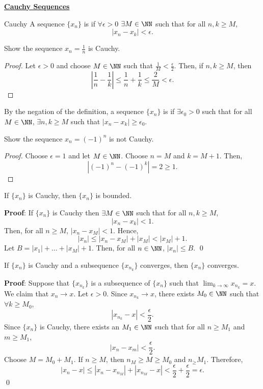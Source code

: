 
\noindent\underline{\textbf{Cauchy Sequences}}

\begin{definition}{Cauchy}
A sequence $\{x_n\}$ is  if $\forall \epsilon>0$ $\exists M \in \NN$ such that for all $n,k \geq M$,
\[
|x_n - x_k| <\epsilon.
\]
\end{definition}

\begin{example}
Show the sequence $x_n = \frac{1}{n}$ is Cauchy. 
\end{example}
\begin{proof}
Let $\epsilon>0$ and choose $M \in \NN$ such that $\frac{1}{M} < \frac{\epsilon}{2}$. Then, if $n,k\geq M$, then 
\[
\left|\frac{1}{n} - \frac{1}{k}\right| \leq \frac{1}{n} + \frac{1}{k} \leq \frac{2}{M} < \epsilon.
\]
\end{proof}

\begin{negation}
By the negation of the definition, a sequence $\{x_n\}$ is  if $\exists \epsilon_0 >0$ such that for all $M\in \NN$, $\exists n,k\geq M$ such that $|x_n - x_k| \geq \epsilon_0$.
\end{negation}

\begin{example}
Show the sequence $x_n = (-1)^n$ is not Cauchy.
\end{example}
\begin{proof}
Choose $\epsilon = 1$ and let $M\in \NN$. Choose $n = M$ and $k = M+1$. Then, 
\[
|(-1)^n - (-1)^k| = 2 \geq 1.
\]
\end{proof}

\begin{theorem}
If $\{x_n\}$ is Cauchy, then $\{x_n\}$ is bounded.
\end{theorem}
\textbf{Proof}: If $\{x_n\}$ is Cauchy then $\exists M\in \NN$ such that for all $n,k\geq M$, 
\[
|x_n - x_k|< 1.
\]
Then, for all $n\geq M$, $|x_n - x_M| <1.$ Hence, 
\[
|x_n| \leq |x_n-x_M| + |x_M| < |x_M| + 1.
\]
Let $B = |x_1|+\dots+|x_M|+1$. Then, for all $n\in \NN$, $|x_n| \leq B.$ \qed 

\begin{theorem}
If $\{x_n\}$ is Cauchy and a subsequence $\{x_{n_k}\}$ converges, then $\{x_n\}$ converges.
\end{theorem}
\textbf{Proof}: Suppose that $\{x_{n_k}\}$ is a subsequence of $\{x_n\}$ such that $\lim_{k\to \infty} x_{n_k} =x$. We claim that $x_n \to x$. Let $\epsilon>0$. Since $x_{n_k}\to x$, there exists $M_0 \in \NN$ such that $\forall k \geq M_0$, 
\[
|x_{n_k} - x| < \frac{\epsilon}{2}.
\]
Since $\{x_n\}$ is Cauchy, there exists an $M_1 \in \NN$ such that for all $n \geq M_1$ and $m\geq M_1$, 
\[
|x_n-x_m|<\frac{\epsilon}{2}.
\]
Choose $M = M_0 + M_1$. If $n\geq M$, then $n_M \geq M \geq M_0$ and $n_ \geq M_1$. Therefore, 
\[
|x_n-x| \leq |x_n -x_{n_M}| + |x_{n_M} - x| < \frac{\epsilon}{2}+ \frac{\epsilon}{2} = \epsilon.
\] 
\qed 

